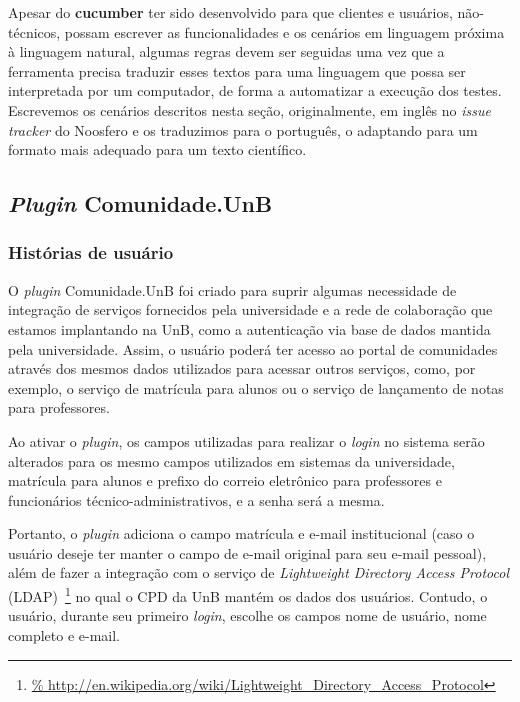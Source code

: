Apesar do \textbf{cucumber} ter sido desenvolvido para que clientes e usuários,
não-técnicos, possam escrever as funcionalidades e os cenários em linguagem
próxima à linguagem natural, algumas regras devem ser seguidas uma vez que
a ferramenta precisa traduzir esses textos para uma linguagem que possa ser
interpretada por um computador, de forma a automatizar a execução dos testes.
%
Escrevemos os cenários descritos nesta seção, originalmente, em inglês no
\textit{issue tracker} do Noosfero e os traduzimos para o português,
o adaptando para um formato mais adequado para um texto científico.


\subsection{\textit{Plugin} Comunidade.UnB}

\subsubsection*{Histórias de usuário}

O \textit{plugin} Comunidade.UnB foi criado para suprir algumas necessidade de
integração de serviços fornecidos pela universidade e a rede de colaboração que
estamos implantando na UnB, como a autenticação via base de dados mantida pela universidade.
%
Assim, o usuário poderá ter acesso ao portal de comunidades através dos mesmos
dados utilizados para acessar outros serviços, como, por exemplo, o serviço de
matrícula para alunos ou o serviço de lançamento de notas para professores.

Ao ativar o \textit{plugin}, os campos utilizadas para realizar o \textit{login}
no sistema serão alterados para os mesmo campos utilizados em sistemas da
universidade, matrícula para alunos e prefixo do correio eletrônico para
professores e funcionários técnico-administrativos, e a senha será a mesma.

Portanto, o \textit{plugin} adiciona o campo matrícula e e-mail institucional
(caso o usuário deseje ter manter o campo de e-mail original para seu e-mail
pessoal), além de fazer a integração com o serviço de \textit{Lightweight
Directory Access Protocol} (LDAP)~\footnote{\url{%
http://en.wikipedia.org/wiki/Lightweight_Directory_Access_Protocol}}
no qual o CPD da UnB mantém os dados dos usuários. Contudo, o usuário, durante
seu primeiro \textit{login}, escolhe os campos nome de usuário, nome completo
e e-mail.

